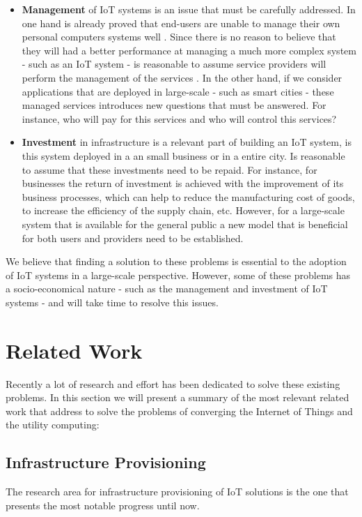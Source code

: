 \begin{itemize}
  \item \textbf{Management} of IoT systems is an issue that must be carefully addressed. In one hand
  is already proved that end-users are unable to manage their own personal computers systems well
  \cite{doll1988measurement}. Since there is no reason to believe that they will had a better
  performance at managing a much more complex system - such as an \gls{IoT} system - is reasonable to
  assume service providers will perform the management of the services . In the other hand, if we
  consider applications that are deployed in large-scale - such as smart cities - these managed
  services introduces new questions that must be answered. For instance, who will pay for this
  services and who will control this services?
  \item \textbf{Investment} in infrastructure is a relevant part of building an \gls{IoT} system,
  is this system deployed in a an small business or in a entire city. Is reasonable to assume that
  these investments need to be repaid. For instance, for businesses the return of investment is
  achieved with the improvement of its business processes, which can help to reduce the manufacturing
  cost of goods, to increase the efficiency of the supply chain, etc. However, for a large-scale
  system that is available for the general public a new model that is beneficial for both users and
  providers need to be established.
\end{itemize}

We believe that finding a solution to these problems is essential to the adoption of \gls{IoT} systems
in a large-scale perspective. However, some of these problems has a socio-economical nature - such as
the management and investment of \gls{IoT} systems - and will take time to resolve this issues.

\section{Related Work}
\label{section:related_work}
Recently a lot of research and effort has been dedicated to solve these existing problems. In this
section we will present a summary of the most relevant related work that address to solve the
problems of converging the Internet of Things and the utility computing:

\subsection{Infrastructure Provisioning}
\label{sub:provisioning}
The research area for infrastructure provisioning of IoT solutions is the one that presents the most
notable progress until now.

